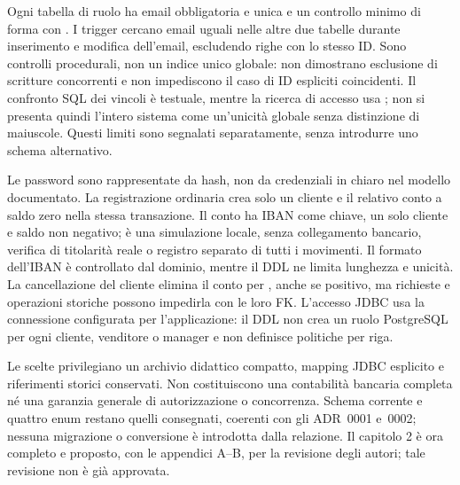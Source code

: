 Ogni tabella di ruolo ha email obbligatoria e unica e un controllo
minimo di forma con . I trigger cercano email uguali nelle
altre due tabelle durante inserimento e modifica dell'email, escludendo
righe con lo stesso ID. Sono controlli procedurali, non un indice unico
globale: non dimostrano esclusione di scritture concorrenti e non
impediscono il caso di ID espliciti coincidenti. Il confronto SQL dei
vincoli è testuale, mentre la ricerca di accesso usa ;
non si presenta quindi l'intero sistema come un'unicità globale senza
distinzione di maiuscole. Questi limiti sono segnalati separatamente,
senza introdurre uno schema alternativo.

Le password sono rappresentate da hash, non da credenziali in chiaro
nel modello documentato. La registrazione ordinaria crea solo un cliente
e il relativo conto a saldo zero nella stessa transazione.
Il conto ha IBAN come chiave, un solo cliente e saldo non negativo;
è una simulazione locale, senza collegamento bancario, verifica di
titolarità reale o registro separato di tutti i movimenti. Il formato
dell'IBAN è controllato dal dominio, mentre il DDL ne limita lunghezza
e unicità. La cancellazione del cliente elimina il conto per
, anche se positivo, ma richieste e operazioni storiche
possono impedirla con le loro FK. L'accesso JDBC usa la connessione
configurata per l'applicazione: il DDL non crea un ruolo PostgreSQL per
ogni cliente, venditore o manager e non definisce politiche per riga.

Le scelte privilegiano un archivio didattico compatto, mapping JDBC
esplicito e riferimenti storici conservati. Non costituiscono una
contabilità bancaria completa né una garanzia generale di autorizzazione
o concorrenza. Schema corrente e quattro enum restano quelli consegnati,
coerenti con gli ADR~0001 e~0002; nessuna migrazione o conversione è
introdotta dalla relazione. Il capitolo 2 è ora completo e proposto,
con le appendici A--B, per la revisione degli autori; tale revisione
non è già approvata.
